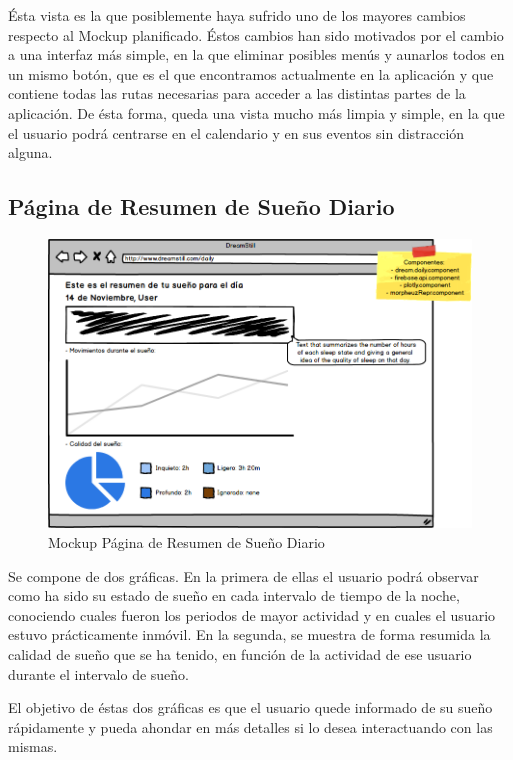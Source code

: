 \documentclass[11pt,openany]{book}
\begin{document}
Ésta vista es la que posiblemente haya sufrido uno de los mayores cambios respecto al Mockup planificado. Éstos cambios han sido motivados por el cambio a una interfaz más simple, en la que eliminar posibles menús y aunarlos todos en un mismo botón, que es el que encontramos actualmente en la aplicación y que contiene todas las rutas necesarias para acceder a las distintas partes de la aplicación. De ésta forma, queda una vista mucho más limpia y simple, en la que el usuario podrá centrarse en el calendario y en sus eventos sin distracción alguna.

\subsection{Página de Resumen de Sueño Diario}

\begin{figure}[H]
\centering
\includegraphics[totalheight=6.5cm]{mockups/DailyDreamPage.png}
\caption{Mockup Página de Resumen de Sueño Diario}
\end{figure}
\par\bigskip 
\noindent

Se compone de dos gráficas. En la primera de ellas el usuario podrá observar como ha sido su estado de sueño en cada intervalo de tiempo de la noche, conociendo cuales fueron los periodos de mayor actividad y en cuales el usuario estuvo prácticamente inmóvil. En la segunda, se muestra de forma resumida la calidad de sueño que se ha tenido, en función de la actividad de ese usuario durante el intervalo de sueño. 

El objetivo de éstas dos gráficas es que el usuario quede informado de su sueño rápidamente y pueda ahondar en más detalles si lo desea interactuando con las mismas.
\end{document}

